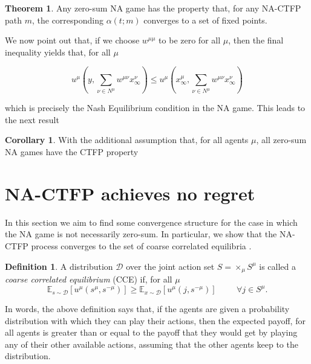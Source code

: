 \documentclass{article}
\theoremstyle{definition}
\newtheorem{definition}{Definition}
\newtheorem{theorem}{Theorem}
\newtheorem{corollary}{Corollary}
\newcommand{\wmunu}{w^{\mu \nu}}
\newcommand{\xmu}{x^{\mu}}
\newcommand{\xnu}{x^{\nu}}
\begin{document}
  \begin{theorem}
    Any zero-sum NA game has the property that, for any NA-CTFP path $m$, the corresponding $\alpha(t; m)$ converges to a set of fixed points.
  \end{theorem}


  We now point out that, if we choose $w^{\mu \mu}$ to be zero for all $\mu$, then the final inequality yields that, for all $\mu$

  \begin{equation}
    u^\mu(y, \sum_{\nu \in N^\mu} \wmunu \xnu_\infty) \leq u^\mu(\xmu_\infty, \sum_{\nu \in N^\mu} \wmunu \xnu_\infty)
  \end{equation}

  which is precisely the Nash Equilibrium condition in the NA game. This leads to the next result

  \begin{corollary}
    With the additional assumption that, for all agents $\mu$, all zero-sum NA games have the CTFP property
  \end{corollary}

\section{NA-CTFP achieves no regret}
  \label{sec::CCEConvergence}

  In this section we aim to find some convergence structure for the
  case in which the NA game is not necessarily zero-sum. In
  particular, we show that the NA-CTFP process converges to the set of
  coarse correlated equilibria \cite{}.
  \begin{definition}
    A distribution $\mathcal{D}$ over the joint action set $S =
    \times_\mu S^\mu$ is called a \emph{coarse correlated equilibrium}
    (CCE) if, for all $\mu$
    \begin{equation}
      \mathbb{E}_{s \sim \mathcal{D}}[u^\mu (s^\mu, s^{- \mu})] \geq
      \mathbb{E}_{x \sim \mathcal{D}}[u^\mu (j, s^{-
          \mu})] \hspace{1cm} \forall j \in S^\mu.
    \end{equation}
  \end{definition}

  In words, the above definition says that, if the agents are given a
  probability distribution with which they can play their actions, then
  the expected payoff, for all agents is greater than or equal to the
  payoff that they would get by playing any of their other available
  actions, assuming that the other agents keep to the distribution.
\end{document}
